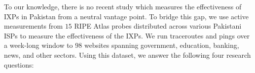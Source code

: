 \documentclass[sigconf,anonymous,10pt]{acmart}
\begin{document}
%
%
%
%
%



To our knowledge, there is no recent study which measures the effectiveness of IXPs in Pakistan from a neutral vantage point.
To bridge this gap, we use active measurements from $15$ RIPE Atlas probes distributed across various Pakistani ISPs to measure the effectiveness of the IXPs. We run traceroutes and pings over a week-long window to $98$ websites spanning government, education, banking, news, and other sectors. %
Using this dataset, we answer the following four research questions:
\end{document}
